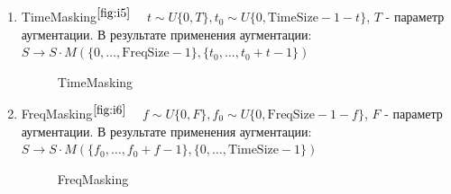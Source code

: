 \documentclass[12pt, fleqn]{article}
\begin{document}
\begin{enumerate}
	\item TimeMasking$^{\ref{fig:i5}}$ ~\cite{SpecAugment} \newline 
	$t \sim U\{0, T\}, t_0 \sim U\{0, \text{TimeSize} - 1 - t\}$, $T$ - параметр аугментации. \newline 
	В результате применения аугментации: \newline
	$S \rightarrow S \cdot M(\{0, \ldots, \text{FreqSize} - 1\}, \{t_0, \ldots, t_0 + t - 1\}) $
	\begin{figure}[ht!]
		\caption{TimeMasking}
		\label{fig:i5}
	\end{figure}
	\item FreqMasking$^{\ref{fig:i6}}$ ~\cite{SpecAugment} \newline
	$f \sim U\{0, F\}, f_0 \sim U\{0, \text{FreqSize} - 1 - f\}$, $F$ - параметр аугментации. \newline
	В результате применения аугментации: \newline
	$S \rightarrow S \cdot M(\{f_0, \ldots, f_0 + f - 1\}, \{0, \ldots, \text{TimeSize} - 1\}) $
	\begin{figure}[ht!]
		\caption{FreqMasking}

\end{figure}
\end{enumerate}
\end{document}

